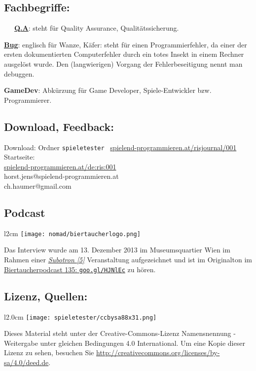 \documentclass[10pt,a4paper,ngerman,twoside]{article} %
\begin{document}
\subsection*{Fachbegriffe:}
~~~\href{https://de.wikipedia.org/wiki/Quality_Assurance}{\textbf{Q.A}}: steht für Quality Assurance,  Qualitätssicherung.

\href{https://de.wikipedia.org/wiki/Programmfehler}{\textbf{Bug}}: englisch für Wanze, Käfer: steht für einen Programmierfehler, da einer der ersten dokumentierten Computerfehler durch ein totes Insekt in einem Rechner ausgelöst wurde. Den (langwierigen) Vorgang der Fehlerbeseitigung nennt man debuggen.
 
\textbf{GameDev}: Abkürzung für Game Developer, Spiele-Entwickler bzw. Programmierer.

\subsection*{Download, Feedback:}
\footnotesize{
Download: Ordner \texttt{spieletester} \Mundus\ \href{http://spielend-programmieren.at/risjournal/001}{spielend-programmieren.at/risjournal/001}\\
Startseite:\\
\href{http://spielend-programmieren.at/de:ris:001}{spielend-programmieren.at/de:ris:001}\\ 
\Letter\: horst.jens@spielend-programmieren.at\\
\Letter\: ch.haumer@gmail.com\\}
\normalsize 

\subsection*{Podcast}
\begin{wrapfigure}{l}{2cm}
\texttt{[image: nomad/biertaucherlogo.png]}
\end{wrapfigure}
Das Interview wurde am 13. Dezember 2013 im Museumsquartier Wien im Rahmen einer \href{http://subotron.com/}{\textit{Subotron [5]}} Veranstaltung aufgezeichnet und ist im Originalton im \href{http://spielend-programmieren.at/de:podcast:biertaucher:2013:135}{Biertaucherpodcast 135: \texttt{goo.gl/HJNlEc}} zu hören.

\subsection*{Lizenz, Quellen:}
\begin{wrapfigure}{l}{2.0cm}
\texttt{[image: spieletester/ccbysa88x31.png]}
\end{wrapfigure}
Dieses Material steht unter der Creative-Commons-Lizenz Namensnennung - Weitergabe unter gleichen Bedingungen 4.0 International. Um eine Kopie dieser Lizenz zu sehen, besuchen Sie \url{http://creativecommons.org/licenses/by-sa/4.0/deed.de}.
\end{document}
